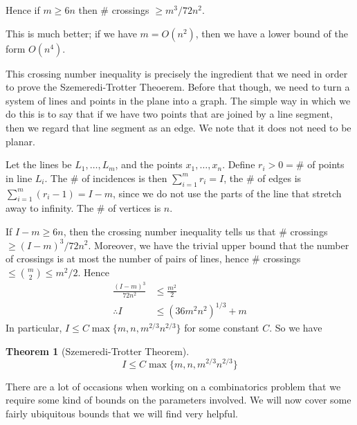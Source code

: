 \documentclass[]{article}
\theoremstyle{custhm}
\newtheorem{theorem}{Theorem}[section]
\theoremstyle{cusdef}
\theoremstyle{custhm}
\theoremstyle{custhm}
\theoremstyle{custhm}
\theoremstyle{custhm}
\theoremstyle{cusdef}
\theoremstyle{remark}
\theoremstyle{custhm}
\begin{document}
Hence if $m \ge 6n$ then $\#$ crossings $\ge m^3/72n^2$.

This is much better; if we have $m = O(n^2)$, then we have a lower bound of the form $O(n^4)$.

This crossing number inequality is precisely the ingredient that we need in order to prove the Szemeredi-Trotter Theoerem. Before that though, we need to turn a system of lines and points in the plane into a graph. The simple way in which we do this is to say that if we have two points that are joined by a line segment, then we regard that line segment as an edge. We note that it does not need to be planar.

Let the lines be $L_1,\dots,L_m$, and the points $x_1,\dots,x_n$. Define $r_i>0 = \#$ of points in line $L_i$. The $\#$ of incidences is then $\sum_{i=1}^{m}r_i = I$, the $\#$ of edges is $\sum_{i=1}^{m}(r_i - 1) = I - m$, since we do not use the parts of the line that stretch away to infinity. The $\#$ of vertices is $n$.

If $I - m \ge 6n$, then the crossing number inequality tells us that $\#$ crossings $\ge (I-m)^3/72n^2$. Moreover, we have the trivial upper bound that the number of crossings is at most the number of pairs of lines, hence $\#$ crossings $\le \binom{m}{2}\le m^2/2$. Hence
\begin{align*}
\frac{(I-m)^3}{72n^2} &\le \frac{m^2}{2}\\
\therefore I &\le (36m^2n^2)^{1/3} + m
\end{align*}
In particular, $I \le C\max\{m,n,m^{2/3}n^{2/3}\}$ for some constant $C$. So we have

\begin{theorem}[Szemeredi-Trotter Theorem]
	\[
	I\le C\max\{m,n,m^{2/3}n^{2/3}\}
	\]
\end{theorem}

There are a lot of occasions when working on a combinatorics problem that we require some kind of bounds on the parameters involved. We will now cover some fairly ubiquitous bounds that we will find very helpful.
\end{document}
